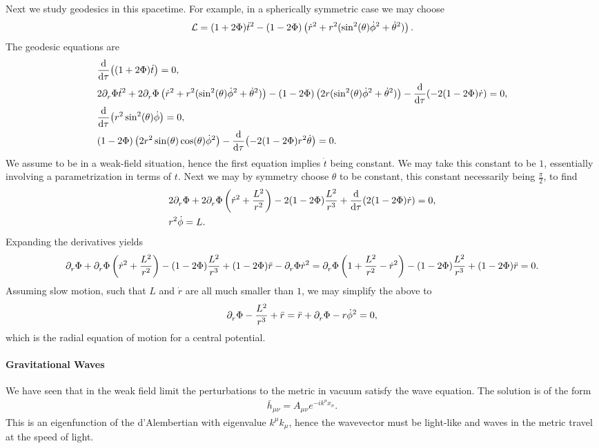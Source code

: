 Next we study geodesics in this spacetime. For example, in a spherically symmetric case we may choose
\begin{align*}
	\mathcal{L} = (1 + 2\Phi)\dot{t}^{2} - (1 - 2\Phi)\left(\dot{r}^{2} + r^{2}(\sin[2](\theta)\dot{\phi}^{2} + \dot{\theta}^{2})\right).
\end{align*}
The geodesic equations are
\begin{align*}
	&\dv{\tau}((1 + 2\Phi)\dot{t}) = 0, \\
	&2\partial^{}_{r}\Phi\dot{t}^{2} + 2\partial^{}_{r}\Phi\left(\dot{r}^{2} + r^{2}(\sin[2](\theta)\dot{\phi}^{2} + \dot{\theta}^{2})\right) - (1 - 2\Phi)\left(2r(\sin[2](\theta)\dot{\phi}^{2} + \dot{\theta}^{2})\right) - \dv{\tau}(-2(1 - 2\Phi)\dot{r}) = 0, \\
	&\dv{\tau}(r^{2}\sin[2](\theta)\dot{\phi}) = 0, \\
	&(1 - 2\Phi)\left(2r^{2}\sin(\theta)\cos(\theta)\dot{\phi}^{2}\right) - \dv{\tau}(-2(1 - 2\Phi)r^{2}\dot{\theta}) = 0.
\end{align*}
We assume to be in a weak-field situation, hence the first equation implies $\dot{t}$ being constant. We may take this constant to be $1$, essentially involving a parametrization in terms of $t$. Next we may by symmetry choose $\theta$ to be constant, this constant necessarily being $\frac{\pi}{2}$, to find
\begin{align*}
	&2\partial^{}_{r}\Phi + 2\partial^{}_{r}\Phi\left(\dot{r}^{2} + \frac{L^{2}}{r^{2}}\right) - 2(1 - 2\Phi)\frac{L^{2}}{r^{3}} + \dv{\tau}(2(1 - 2\Phi)\dot{r}) = 0, \\
	&r^{2}\dot{\phi} = L.
\end{align*}
Expanding the derivatives yields
\begin{align*}
	\partial^{}_{r}\Phi + \partial^{}_{r}\Phi\left(\dot{r}^{2} + \frac{L^{2}}{r^{2}}\right) - (1 - 2\Phi)\frac{L^{2}}{r^{3}} + (1 - 2\Phi)\ddot{r} - \partial^{}_{r}\Phi\dot{r}^{2} = \partial^{}_{r}\Phi\left(1 + \frac{L^{2}}{r^{2}} - \dot{r}^{2}\right) - (1 - 2\Phi)\frac{L^{2}}{r^{3}} + (1 - 2\Phi)\ddot{r} = 0.
\end{align*}
Assuming slow motion, such that $L$ and $\dot{r}$ are all much smaller than $1$, we may simplify the above to
\begin{align*}
	\partial^{}_{r}\Phi - \frac{L^{2}}{r^{3}} + \ddot{r} = \ddot{r} + \partial^{}_{r}\Phi - r\dot{\phi}^{2} = 0,
\end{align*}
which is the radial equation of motion for a central potential.

\paragraph{Gravitational Waves}
We have seen that in the weak field limit the perturbations to the metric in vacuum satisfy the wave equation. The solution is of the form
\begin{align*}
	\bar{h}_{\mu\nu} = A_{\mu\nu}e^{-ik^{\sigma}x_{\sigma}}.
\end{align*}
This is an eigenfunction of the d'Alembertian with eigenvalue $k^{\mu}k_{\mu}$, hence the wavevector must be light-like and waves in the metric travel at the speed of light.

